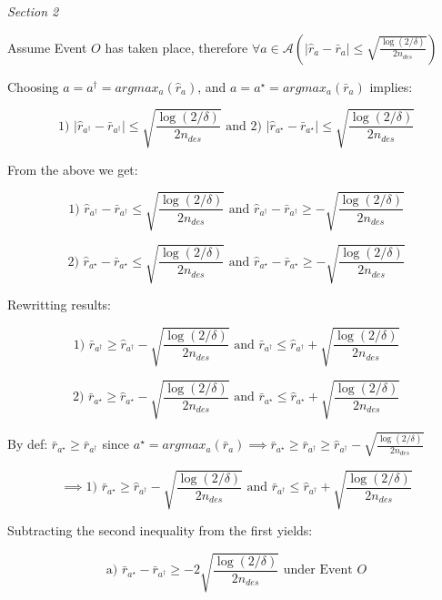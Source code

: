\documentclass{article}
\begin{document}
\textit{Section 2}

Assume Event $O$ has taken place, therefore $\forall a \in \mathcal{A} \left(\left|\hat{r}_{a} - \bar{r}_{a} \right| \leq \sqrt{\frac{\log (2/\delta)}{2n_{des}}}\right)$

Choosing $a = a^{\dagger} = argmax_{a}(\hat{r}_{a})$, and $a = a^{\star} = argmax_{a}(\bar{r}_{a})$ implies:

$$\text{1) } \left|\hat{r}_{a^{\dagger}} - \bar{r}_{a^{\dagger}} \right| \leq \sqrt{\frac{\log (2/\delta)}{2n_{des}}} \text{ and 2) } \left|\hat{r}_{a^{\star}} - \bar{r}_{a^{\star}} \right| \leq \sqrt{\frac{\log (2/\delta)}{2n_{des}}}$$

From the above we get: 

$$\text{1) } \hat{r}_{a^{\dagger}} - \bar{r}_{a^{\dagger}} \leq \sqrt{\frac{\log (2/\delta)}{2n_{des}}} \text{ and } \hat{r}_{a^{\dagger}} - \bar{r}_{a^{\dagger}} \geq -\sqrt{\frac{\log (2/\delta)}{2n_{des}}}$$

$$\text{2) } \hat{r}_{a^{\star}} - \bar{r}_{a^{\star}} \leq \sqrt{\frac{\log (2/\delta)}{2n_{des}}} \text{ and } \hat{r}_{a^{\star}} - \bar{r}_{a^{\star}} \geq -\sqrt{\frac{\log (2/\delta)}{2n_{des}}}$$

Rewritting results: 

$$\text{1) } \bar{r}_{a^{\dagger}} \geq \hat{r}_{a^{\dagger}} - \sqrt{\frac{\log (2/\delta)}{2n_{des}}} \text{ and } \bar{r}_{a^{\dagger}} \leq \hat{r}_{a^{\dagger}} + \sqrt{\frac{\log (2/\delta)}{2n_{des}}}$$ 

$$\text{2) } \bar{r}_{a^{\star}} \geq \hat{r}_{a^{\star}} - \sqrt{\frac{\log (2/\delta)}{2n_{des}}} \text{ and } \bar{r}_{a^{\star}} \leq \hat{r}_{a^{\star}} + \sqrt{\frac{\log (2/\delta)}{2n_{des}}}$$ 

By def: $\bar{r}_{a^{\star}} \geq \bar{r}_{a^{\dagger}}$ since $a^{\star} = argmax_{a}(\bar{r}_{a}) \implies \bar{r}_{a^{\star}} \geq \bar{r}_{a^{\dagger}} \geq \hat{r}_{a^{\dagger}} - \sqrt{\frac{\log (2/\delta)}{2n_{des}}}$

$$\implies \text{1) } \bar{r}_{a^{\star}} \geq \hat{r}_{a^{\dagger}} - \sqrt{\frac{\log (2/\delta)}{2n_{des}}} \text{ and } \bar{r}_{a^{\dagger}} \leq \hat{r}_{a^{\dagger}} + \sqrt{\frac{\log (2/\delta)}{2n_{des}}}$$

Subtracting the second inequality from the first yields:

$$\text{a) } \bar{r}_{a^{\star}} - \bar{r}_{a^{\dagger}} \geq -2 \sqrt{\frac{\log (2/\delta)}{2n_{des}}} \text{ under Event $O$}$$
\end{document}
